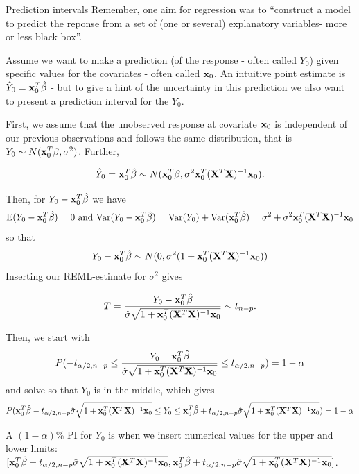 \documentclass[
  ignorenonframetext,
]{beamer}
\begin{document}
\begin{frame}
\begin{block}{Prediction intervals}
\label{prediction-intervals}
Remember, one aim for regression was to ``construct a model to predict
the reponse from a set of (one or several) explanatory variables- more
or less black box''.

Assume we want to make a prediction (of the response - often called
\(Y_0\)) given specific values for the covariates - often called
\({\bf x}_0\). An intuitive point estimate is
\(\hat{Y}_0={\bf x}_0^T \hat{\beta}\) - but to give a hint of the
uncertainty in this prediction we also want to present a prediction
interval for the \(Y_0\).
\end{block}
\end{frame}

\begin{frame}
First, we assume that the unobserved response at covariate \({\bf x}_0\)
is independent of our previous observations and follows the same
distribution, that is \(Y_0 \sim N({\bf x}_0^T \beta,\sigma^2)\).
Further,

\[\hat{Y}_0={\bf x}_0^T \hat{\beta} \sim N({\bf x}_0^T \beta,\sigma^2 {\bf x}_0^T({\bf X}^T{\bf X})^{-1}{\bf x}_0).\]

Then, for \(Y_0-{\bf x}_0^T \hat{\beta}\) we have
\[\text{E}(Y_0-{\bf x}_0^T \hat{\beta})=0 \text{ and } \text{Var}(Y_0-{\bf x}_0^T \hat{\beta})=\text{Var}(Y_0)+\text{Var}({\bf x}_0^T \hat{\beta})=\sigma^2+\sigma^2{\bf x}_0^T({\bf X}^T{\bf X})^{-1}{\bf x}_0\]
so that
\[Y_0-{\bf x}_0^T \hat{\beta}\sim N(0,\sigma^2 (1+{\bf x}_0^T({\bf X}^T{\bf X})^{-1}{\bf x}_0)) \]
Inserting our REML-estimate for \(\sigma^2\) gives

\[T=\frac{Y_0-{\bf x}_0^T \hat{\beta}}{\hat{\sigma}\sqrt{1+{\bf x}_0^T({\bf X}^T{\bf X})^{-1}{\bf x}_0}}\sim t_{n-p}.\]
\end{frame}

\begin{frame}
Then, we start with
\[ P(-t_{\alpha/2,n-p}\le \frac{Y_0-{\bf x}_0^T \hat{\beta}}{\hat{\sigma}\sqrt{1+{\bf x}_0^T({\bf X}^T{\bf X})^{-1}{\bf x}_0}} \le t_{\alpha/2,n-p})=1-\alpha\]
and solve so that \(Y_0\) is in the middle, which gives
\[P({\bf x}_0^T \hat{\beta}-t_{\alpha/2,n-p}\hat{\sigma}\sqrt{1+{\bf x}_0^T({\bf X}^T{\bf X})^{-1}{\bf x}_0} \le Y_0 \le {\bf x}_0^T \hat{\beta}+t_{\alpha/2,n-p}\hat{\sigma}\sqrt{1+{\bf x}_0^T({\bf X}^T{\bf X})^{-1}{\bf x}_0})=1-\alpha\]

A \((1-\alpha)\)\% PI for \(Y_0\) is when we insert numerical values for
the upper and lower limits:
\([{\bf x}_0^T \hat{\beta}-t_{\alpha/2,n-p}\hat{\sigma}\sqrt{1+{\bf x}_0^T({\bf X}^T{\bf X})^{-1}{\bf x}_0}, {\bf x}_0^T \hat{\beta}+t_{\alpha/2,n-p}\hat{\sigma}\sqrt{1+{\bf x}_0^T({\bf X}^T{\bf X})^{-1}{\bf x}_0}]\).
\end{frame}
\end{document}
